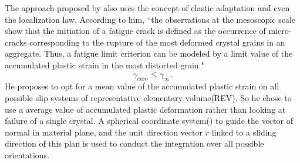 The approach proposed by \cite{papadopoulos1993fatigue} also uses the concept of elastic adaptation and even the localization law. According to him, ``the observations at the mesoscopic scale show that the initiation of a fatigue crack is
defined as the occurrence of micro-cracks corresponding to the rupture of the most deformed crystal grains in an
aggregate. Thus, a fatigue limit criterion can be modeled by a limit value of the accumulated plastic strain in the
most distorted grain."
$$\gamma_{cum}\leqslant\gamma_\infty.$$
He proposes to opt for a mean value of the accumulated plastic strain on all possible slip systems of representative elementary volume(REV). So he chose to use a average value  of accumulated plastic deformation rather than looking at failure of a single crystal. A spherical coordinate system() to guide the vector of normal in material plane, and the unit direction vector $r$ linked to a sliding direction of this plan is used to conduct the integration over all possible orientations.

